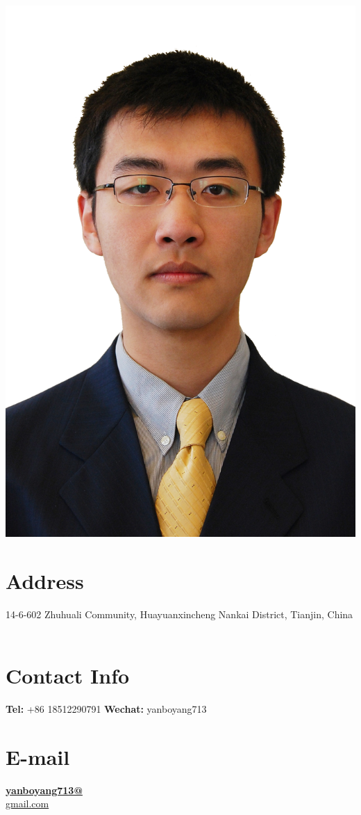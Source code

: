 \documentclass[]{friggeri-cv}
\begin{document}
\begin{aside}
  \includegraphics[scale=0.007]{img/boyang.png}
  \section{Address}
  14-6-602 Zhuhuali Community, Huayuanxincheng
  Nankai District,  Tianjin,
  China
    ~
  \section{Contact Info}
  \textbf{Tel:} +86 18512290791
    \textbf{Wechat:} yanboyang713
    ~
  \section{E-mail}
    \href{mailto:yanboyang713@gmail.com}{\textbf{yanboyang713@}\\gmail.com}
    ~

\end{aside}
\end{document}
